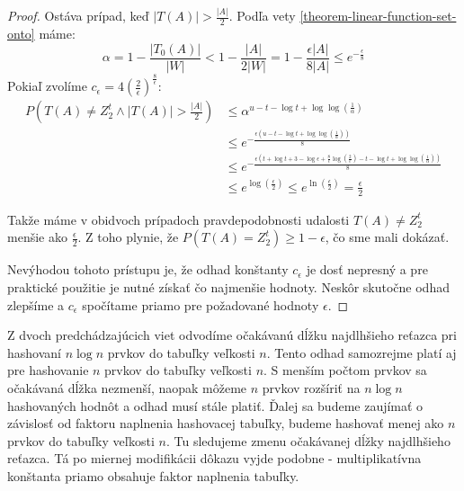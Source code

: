\begin{proof}
Ostáva prípad, keď $|T(A)| > \frac{|A|}{2}$. Podľa vety \ref{theorem-linear-function-set-onto} máme:
\begin{displaymath}
\alpha = 1 - \frac{|T_0(A)|}{|W|} < 1 - \frac{|A|}{2|W|} = 1 - \frac{\epsilon |A|}{8|A|} \leq e^{-\frac{\epsilon}{8}}
\end{displaymath}
Pokiaľ zvolíme $c_\epsilon = 4\left(\frac{2}{\epsilon}\right)^{\frac{8}{\epsilon}}$:
\begin{displaymath}
\begin{split}
P(T(A) \neq Z_2^t \wedge |T(A)| > \frac{|A|}{2}) 
	& \leq \alpha ^ {u - t - \log t + \log\log\left(\frac{1}{\alpha}\right)} \\
	& \leq e^{-\frac{\epsilon\left(u - t - \log t + \log\log\left(\frac{1}{\alpha}\right)\right)}{8}}	\\
	& \leq e^{-\frac{\epsilon\left(t + \log t + 3 - \log \epsilon + \frac{8}{\epsilon}\log\left(\frac{2}{\epsilon}\right) -t - \log t  + \log\log\left(\frac{1}{\alpha}\right)\right)}{8}} \\
	& \leq e^{{\log\left(\frac{\epsilon}{2}\right)}} 
	\leq e^{\ln\left(\frac{\epsilon}{2}\right)} 
	= \frac{\epsilon}{2}
\end{split}
\end{displaymath}

Takže máme v obidvoch prípadoch pravdepodobnosti udalosti $T(A) \neq Z_2^t$ menšie ako $\frac{\epsilon}{2}$. Z toho plynie, že $P(T(A) = Z_2^t) \geq 1 - \epsilon$, čo sme mali dokázať.

Nevýhodou tohoto prístupu je, že odhad konštanty $c_\epsilon$ je dosť nepresný a pre praktické použitie je nutné získať čo najmenšie hodnoty. Neskôr skutočne odhad zlepšíme a $c_\epsilon$ spočítame priamo pre požadované hodnoty $\epsilon$.
\end{proof}

Z dvoch predchádzajúcich viet odvodíme očakávanú dĺžku najdlhšieho reťazca pri hashovaní $n \log n$ prvkov do tabuľky veľkosti $n$. Tento odhad samozrejme platí aj pre hashovanie $n$ prvkov do tabuľky veľkosti $n$. S menším počtom prvkov sa očakávaná dĺžka nezmenší, naopak môžeme $n$ prvkov rozšíriť na $n \log n$ hashovaných hodnôt a odhad musí stále platiť. Ďalej sa budeme zaujímať o závislosť od faktoru naplnenia hashovacej tabuľky, budeme hashovať menej ako $n$ prvkov do tabuľky veľkosti $n$. Tu sledujeme zmenu očakávanej dĺžky najdlhšieho reťazca. Tá po miernej modifikácii dôkazu vyjde podobne - multiplikatívna konštanta priamo obsahuje faktor naplnenia tabuľky.

